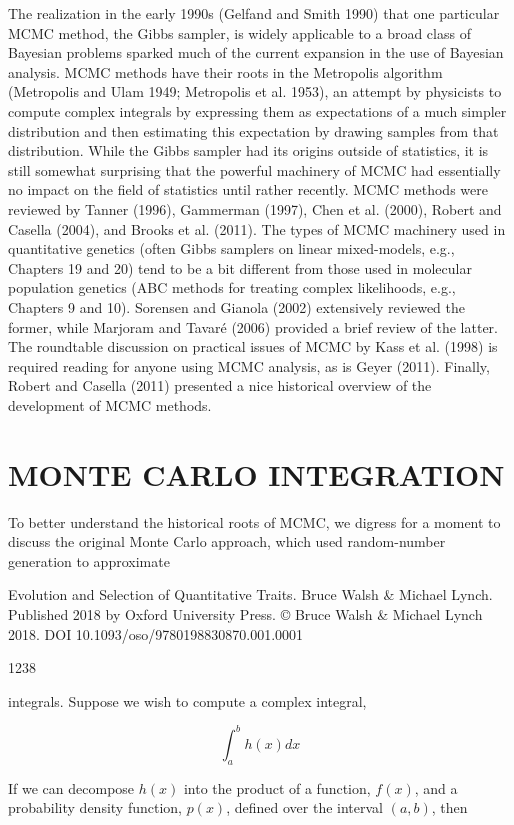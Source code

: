 \documentclass{article}
\begin{document}
The realization in the early 1990s (Gelfand and Smith 1990) that one particular MCMC method, the Gibbs sampler, is widely applicable to a broad class of Bayesian problems sparked much of the current expansion in the use of Bayesian analysis. MCMC methods have their roots in the Metropolis algorithm (Metropolis and Ulam 1949; Metropolis et al. 1953), an attempt by physicists to compute complex integrals by expressing them as expectations of a much simpler distribution and then estimating this expectation by drawing samples from that distribution. While the Gibbs sampler had its origins outside of statistics, it is still somewhat surprising that the powerful machinery of MCMC had essentially no impact on the field of statistics until rather recently. MCMC methods were reviewed by Tanner (1996), Gammerman (1997), Chen et al. (2000), Robert and Casella (2004), and Brooks et al. (2011). The types of MCMC machinery used in quantitative genetics (often Gibbs samplers on linear mixed-models, e.g., Chapters 19 and 20) tend to be a bit different from those used in molecular population genetics (ABC methods for treating complex likelihoods, e.g., Chapters 9 and 10). Sorensen and Gianola (2002) extensively reviewed the former, while Marjoram and Tavaré (2006) provided a brief review of the latter. The roundtable discussion on practical issues of MCMC by Kass et al. (1998) is required reading for anyone using MCMC analysis, as is Geyer (2011). Finally, Robert and Casella (2011) presented a nice historical overview of the development of MCMC methods.

\section{MONTE CARLO INTEGRATION}
To better understand the historical roots of MCMC, we digress for a moment to discuss the original Monte Carlo approach, which used random-number generation to approximate

Evolution and Selection of Quantitative Traits. Bruce Walsh & Michael Lynch. Published 2018 by Oxford University Press. © Bruce Walsh & Michael Lynch 2018. DOI 10.1093/oso/9780198830870.001.0001

1238

integrals. Suppose we wish to compute a complex integral,

\begin{equation}
\int_{a}^{b}h(x)dx
\end{equation}

If we can decompose  $ h(x) $ into the product of a function,  $ f(x) $, and a probability density function,  $ p(x) $, defined over the interval  $ (a, b) $, then
\end{document}
